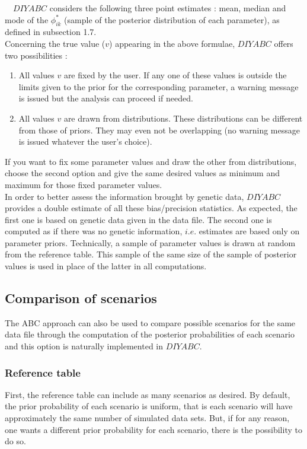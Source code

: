 ~\
$DIYABC$ considers the following three point estimates : mean, median and mode of the  $\phi_{ik}^*$  (sample of the posterior distribution of each parameter), as defined in subsection 1.7.
~\\
 Concerning the true value ($v$) appearing in the above formulae, $DIYABC$ offers two possibilities :
 \begin{enumerate}
 \item All values $v$ are fixed by the user. If any one of these values is outside the limits given to the prior for the corresponding parameter, a warning message is issued but the analysis can proceed if needed.
 \item All values $v$ are drawn from distributions. These distributions can be different from those of priors. They may even not be overlapping (no warning message is issued whatever the user's choice). 
 \end{enumerate}
 If you want to fix some parameter values and draw the other from distributions, choose the second option and give the same desired values as minimum and maximum for those fixed parameter values.\\

In order to better assess the information brought by genetic data, $DIYABC$ provides a double estimate of all these bias/precision statistics. As expected, the first one is based on genetic data given in the data file. The second one is computed as if there was no genetic information, $i.e.$ estimates are based only on parameter priors. Technically, a sample of parameter values is drawn at random from the reference table. This sample of the same size of the sample of posterior values is used in place of the latter in all computations.

\subsection{Comparison of scenarios}
The ABC approach can also be used to compare possible scenarios for the same data file through the computation of the posterior probabilities of each scenario and this option is naturally implemented in $DIYABC$.\\

\subsubsection{Reference table} 
First, the reference table can include as many scenarios as desired. By default, the prior probability of each scenario is uniform, that is each scenario will have approximately the same number of simulated data sets. But, if for any reason, one wants a different prior probability for each scenario, there is the possibility to do so.\\

